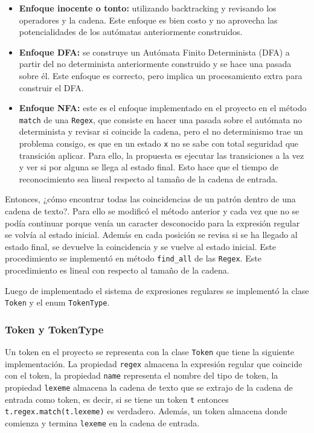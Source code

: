 \begin{itemize}
        \item \textbf{Enfoque inocente o tonto:} utilizando backtracking y revisando los operadores y la cadena. Este enfoque es bien costo y no aprovecha las potencialidades de los autómatas anteriormente construidos.
        \item \textbf{Enfoque DFA:} se construye un Autómata Finito Determinista (DFA) a partir del no determinista anteriormente construido y se hace una pasada sobre él. Este enfoque es correcto, pero implica un procesamiento extra para construir el DFA.
        \item \textbf{Enfoque NFA:} este es el enfoque implementado en el proyecto en el método \verb|match| de una \verb|Regex|, que consiste en hacer una pasada sobre el autómata no determinista y revisar si coincide la cadena, pero el no determinismo trae un problema consigo, es que en un estado \verb|x| no se sabe con total seguridad que transición aplicar. Para ello, la propuesta es ejecutar las transiciones a la vez y ver si por alguna se llega al estado final. Esto hace que el tiempo de reconocimiento sea lineal respecto al tamaño de la cadena de entrada.
\end{itemize}

Entonces, ¿cómo encontrar todas las coincidencias de un patrón dentro de una cadena de texto?. Para ello se modificó el método anterior y cada vez que no se podía continuar  porque venía un caracter desconocido para la expresión regular se volvía al estado inicial. Además en cada posición se revisa si se ha llegado al estado final, se devuelve la coincidencia y se vuelve al estado inicial. Este procedimiento se implementó en método \verb|find_all| de las \verb|Regex|. Este procedimiento es lineal con respecto al tamaño de la cadena.

Luego de implementado el sistema de expresiones regulares se implementó la clase \verb|Token| y el enum \verb|TokenType|.

\subsubsection{Token y TokenType}

Un token en el proyecto se representa con la clase \verb|Token| que tiene la siguiente implementación. La propiedad \verb|regex| almacena la expresión regular que coincide con el token, la propiedad \verb|name| representa el nombre del tipo de token, la propiedad \verb|lexeme| almacena la cadena de texto que se extrajo de la cadena de entrada como token, es decir, si se tiene un token \verb|t| entonces \verb|t.regex.match(t.lexeme)| es verdadero. Además, un token almacena donde comienza y termina \verb|lexeme| en la cadena de entrada.

